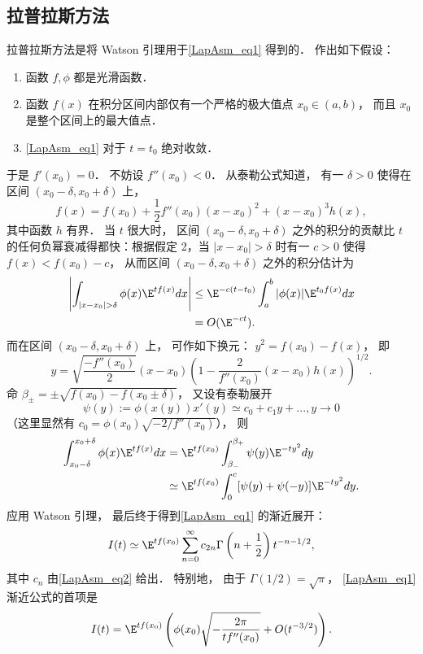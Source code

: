 \subsection{拉普拉斯方法}
拉普拉斯方法是将 Watson 引理用于\autoref{LapAsm_eq1} 得到的． 作出如下假设：

\begin{enumerate}
\item 函数 $f,\phi$ 都是光滑函数．

\item 函数 $f(x)$ 在积分区间内部仅有一个严格的极大值点 $x_0\in(a,b)$， 而且 $x_0$ 是整个区间上的最大值点．

\item \autoref{LapAsm_eq1} 对于 $t=t_0$ 绝对收敛．
\end{enumerate}

于是 $f'(x_0)=0$． 不妨设 $f''(x_0)<0$． 从泰勒公式知道， 有一 $\delta>0$ 使得在区间 $(x_0-\delta,x_0+\delta)$ 上， 
$$
f(x)=f(x_0)+\frac{1}{2}f''(x_0)(x-x_0)^2+(x-x_0)^3h(x),
$$
其中函数 $h$ 有界． 当 $t$ 很大时， 区间 $(x_0-\delta,x_0+\delta)$ 之外的积分的贡献比 $t$ 的任何负幂衰减得都快：根据假定 2，当 $|x-x_0|>\delta$ 时有一 $c>0$ 使得 $f(x)<f(x_0)-c$， 从而区间 $(x_0-\delta,x_0+\delta)$ 之外的积分估计为
$$
\begin{aligned}
\left|\int_{|x-x_0|>\delta}\phi(x)\E^{tf(x)}dx\right|
&\leq \E^{-c(t-t_0)}\int_a^b|\phi(x)|\E^{t_0f(x)}dx\\
&=O(\E^{-ct}).
\end{aligned}
$$
而在区间 $(x_0-\delta,x_0+\delta)$ 上， 可作如下换元： $y^2=f(x_0)-f(x)$， 即
$$
y=\sqrt{\frac{-f''(x_0)}{2}}(x-x_0)\left(1-\frac{2}{f''(x_0)}(x-x_0)h(x)\right)^{1/2}.
$$
命 $\beta_{\pm}=\pm\sqrt{f(x_0)-f(x_0\pm\delta)}$， 又设有泰勒展开
\begin{equation}\label{LapAsm_eq2}
\psi(y):=\phi(x(y))x'(y)\simeq c_0+c_1y+...,y\to 0
\end{equation}
（这里显然有 $c_0=\phi(x_0)\sqrt{-2/f''(x_0)}$）， 则
$$
\begin{aligned}
\int_{x_0-\delta}^{x_0+\delta}\phi(x)\E^{tf(x)}dx
&=\E^{tf(x_0)}\int_{\beta_{-}}^{\beta_+}\psi(y)\E^{-ty^2}dy\\
&\simeq\E^{tf(x_0)}\int_{0}^{c}[\psi(y)+\psi(-y)]\E^{-ty^2}dy.
\end{aligned}
$$
应用 Watson 引理， 最后终于得到\autoref{LapAsm_eq1} 的渐近展开：
\begin{equation}\label{LapAsm_eq3}
I(t)\simeq \E^{tf(x_0)}\sum_{n=0}^\infty c_{2n}\Gamma\left(n+\frac{1}{2}\right)t^{-n-1/2},
\end{equation}
其中 $c_n$ 由\autoref{LapAsm_eq2} 给出． 特别地， 由于 $\Gamma(1/2)=\sqrt{\pi}$， \autoref{LapAsm_eq1} 渐近公式的首项是
$$
I(t)=\E^{tf(x_0)}\left(\phi(x_0)\sqrt{-\frac{2\pi}{tf''(x_0)}}+O(t^{-3/2})\right).
$$

